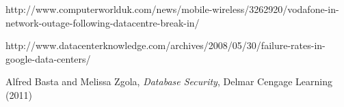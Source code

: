 \documentclass[11pt]{article}
\begin{document}
\begin{thebibliography}{}
  http://www.computerworlduk.com/news/mobile-wireless/3262920/vodafone-in-network-outage-following-datacentre-break-in/

  http://www.datacenterknowledge.com/archives/2008/05/30/failure-rates-in-google-data-centers/

  

  Alfred Basta and Melissa Zgola, {\it Database Security}, Delmar Cengage Learning (2011)

\end{thebibliography}
\end{document}
